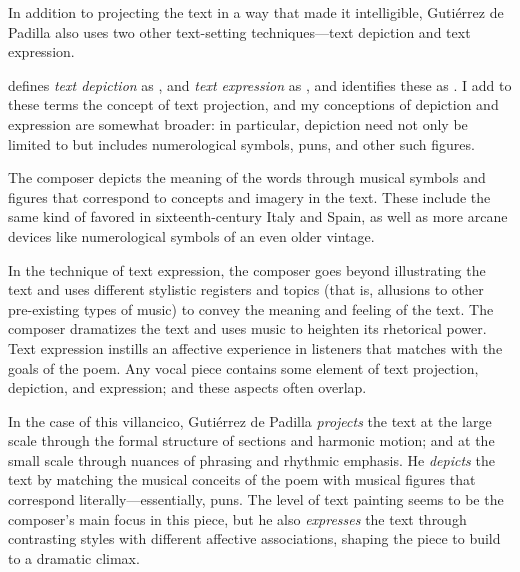 In addition to projecting the text in a way that made it intelligible, Gutiérrez
de Padilla also uses two other text-setting techniques---text depiction and text
expression.%
\begin{Footnote}
    \Autocite[207]{Burkholder:History} defines \emph{text depiction} as
    , and
    \emph{text expression} as , and identifies these as .
    I add to these terms the concept of text projection, and my conceptions of
    depiction and expression are somewhat broader: in particular, depiction need
    not only be limited to  but includes numerological
    symbols, puns, and other such figures.
\end{Footnote}
The composer depicts the meaning of the words through musical symbols and
figures that correspond to concepts and imagery in the text.
These include the same kind of  favored in
sixteenth-century Italy and Spain, as well as more arcane devices like
numerological symbols of an even older vintage.

In the technique of text expression, the composer goes beyond illustrating the
text and uses different stylistic registers and topics (that is, allusions to
other pre-existing types of music) to convey the meaning and feeling of the
text.
The composer dramatizes the text and uses music to heighten its rhetorical
power.
Text expression instills an affective experience in listeners that matches with
the goals of the poem.
Any vocal piece contains some element of text projection, depiction, and
expression; and these aspects often overlap.

In the case of this villancico, Gutiérrez de Padilla \emph{projects} the text at
the large scale through the formal structure of sections and harmonic motion;
and at the small scale through nuances of phrasing and rhythmic emphasis.
He \emph{depicts} the text by matching the musical conceits of the poem with
musical figures that correspond literally---essentially, puns.
The level of text painting seems to be the composer's main focus in this piece,
but he also \emph{expresses} the text through contrasting styles with different
affective associations, shaping the piece to build to a dramatic climax.

